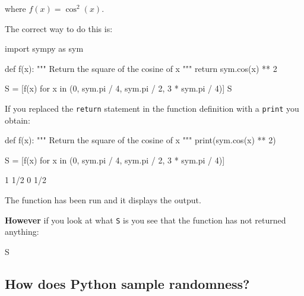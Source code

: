 where \(f(x)= \cos^2(x)\).


The correct way to do this is:




\begin{pyin}
import sympy as sym


def f(x):
    """
    Return the square of the cosine of x
    """
    return sym.cos(x) ** 2


S = [f(x) for x in (0, sym.pi / 4, sym.pi / 2, 3 * sym.pi / 4)]
S
\end{pyin}





\begin{raw}
[1, 1/2, 0, 1/2]
\end{raw}





If you replaced the \texttt{return} statement in the function definition with a
\texttt{print} you obtain:




\begin{pyin}
def f(x):
    """
    Return the square of the cosine of x
    """
    print(sym.cos(x) ** 2)


S = [f(x) for x in (0, sym.pi / 4, sym.pi / 2, 3 * sym.pi / 4)]
\end{pyin}





\begin{raw}
1
1/2
0
1/2
\end{raw}





The function has been run and it displays the output.


\textbf{However} if you look at what \texttt{S} is you see that the function has not returned
anything:




\begin{pyin}
S
\end{pyin}





\begin{raw}
\end{raw}







\subsection{How does Python sample randomness?}
\label{\detokenize{tools-for-mathematics/06-probability/why/main:how-does-python-sample-randomness}}

